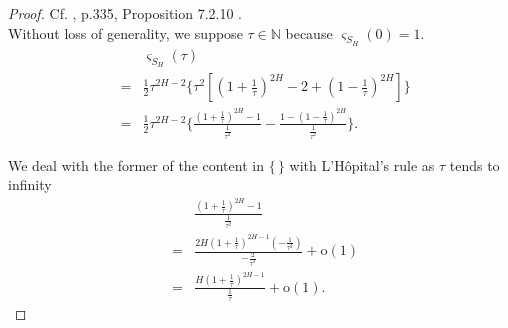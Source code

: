 \documentclass[a4paper, twoside, 11pt]{article}
\theoremstyle{definition}
\newcommand{\brkt}[1]{\left({#1} \right)}
\begin{document}
  \begin{proof}
	Cf. \cite{nourdin}, p.335, Proposition 7.2.10 .\\
	Without loss of generality, we suppose $\tau \in \mathbb{N}$ because $\varsigma_{S_H}(0)=1$. 
	\begin{eqnarray*}
	  &&\varsigma_{S_H}(\tau) \\
	&=& \frac{1}{2} \tau^{2H-2}\{ \tau^2[(1+\frac{1}{\tau})^{2H} - 2 + (1-\frac{1}{\tau})^{2H}] \} \\
	&=& \frac{1}{2} \tau^{2H-2}\{ \frac{(1+\frac{1}{\tau})^{2H} - 1 } {\frac{1}{\tau^2}} -  \frac{1 - (1-\frac{1}{\tau})^{2H}} {\frac{1}{\tau^2}} \}.
  \end{eqnarray*}

  We deal with the former of the content in $\{\,\}$ with L'H\^opital's rule as $\tau$ tends to infinity
  \begin{eqnarray*}
	&&\frac{(1+\frac{1}{\tau})^{2H} - 1 } {\frac{1}{\tau^2}} \\
  &=& \frac{2H(1+\frac{1}{\tau})^{2H-1}(-\frac{1}{\tau^2})}{-\frac{2}{\tau^3}} + \mathrm{o}(1)\\
  &=& \frac{H(1+\frac{1}{\tau})^{2H-1}}{\frac{1}{\tau}} + \mathrm{o}(1).
  \end{eqnarray*}


\end{proof}
\end{document}
